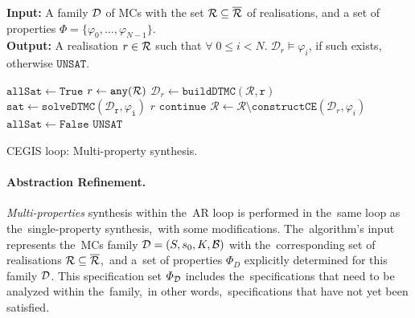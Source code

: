 \begin{algorithm}[h!]
\hspace*{\algorithmicindent} \textbf{Input:} A family $\mathcal{D}$ of MCs with the set $\mathcal{R} \subseteq \overline{\mathcal{R}}$ of realisations, and a set of properties $\varPhi = \{ \varphi_0, \dots, \varphi_{N-1} \}$. \\
\hspace*{\algorithmicindent} \textbf{Output:}  A realisation $r \in \mathcal{R}$ such that $\forall \; 0 \leq i < N. \; \mathcal{D}_r \models \varphi_i$, if such exists, otherwise $\mathtt{UNSAT}$. \\
\vspace*{-1.5em}
\begin{algorithmic}[1]
    \WHILE{$\rlz \neq \emptyset$}
        \STATE $\mathtt{allSat} \leftarrow \mathtt{True}$
        \STATE $r \leftarrow \mathtt{any(\mathcal{R})}$
        \STATE $\mathcal{D}_r\leftarrow \mathtt{buildDTMC(\mathcal{R}, r)}$
            \STATE $\mathtt{sat} \leftarrow \mathtt{solveDTMC(\mathcal{D}_r, \varphi_{i})}$
                    \RETURN $r$
                \ELSE
                    \STATE $\mathtt{continue}$
                \ENDIF
            \ELSE
                \STATE $\mathcal{R} \leftarrow \mathcal{R} \setminus \mathtt{constructCE}(\mathcal{D}_r, \varphi_{i})$
                \STATE $\mathtt{allSat} \leftarrow \mathtt{False}$
            \ENDIF
        \ENDFOR
    \ENDWHILE
    \RETURN $\mathtt{UNSAT}$
\end{algorithmic}
\caption{CEGIS loop: Multi-property synthesis.}
\label{alg:cegis_multi}
\end{algorithm}

\paragraph{Abstraction Refinement.}
\textit{Multi-properties} synthesis within the~AR loop is performed in the~same loop as the~single-property synthesis,~with some modifications.
The~algorithm's input represents the~MCs family $\mathcal{D} = (S,s_{0},K,\mathcal{B})$ with the~corresponding set of realisations $\mathcal{R} \subseteq \overline{\mathcal{R}}$,~and a~set of properties $\varPhi_D$ explicitly determined for this family $\mathcal{D}$.
This specification set $\varPhi_{\mathcal{D}}$ includes the~specifications that need to be analyzed within the~family,~in other words,~specifications that have not yet been satisfied.

